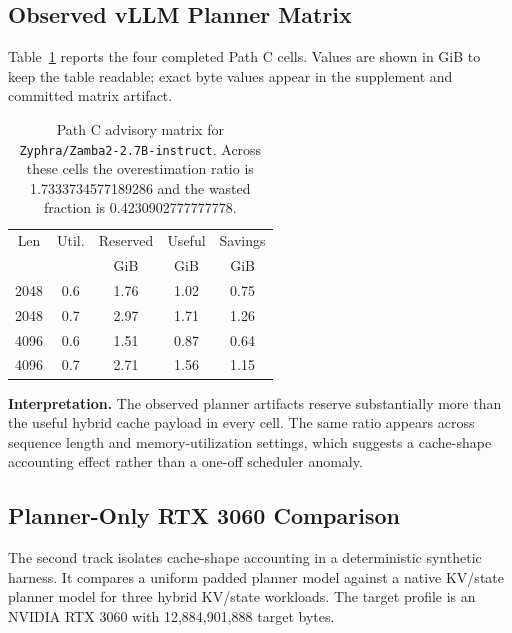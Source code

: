 \documentclass[10pt,twocolumn]{article}
\newcommand{\pathc}{Path C}
\newcommand{\plannerpad}{uniform padded}
\newcommand{\plannernative}{native KV/state}
\begin{document}
\subsection{Observed vLLM Planner Matrix}

Table~\ref{tab:pathc} reports the four completed \pathc{} cells. Values are
shown in GiB to keep the table readable; exact byte values appear in the
supplement and committed matrix artifact.

\begin{table}[t]
\centering
\small
\begin{tabular}{ccccc}
\toprule
Len & Util. & Reserved & Useful & Savings \\
 & & GiB & GiB & GiB \\
\midrule
2048 & 0.6 & 1.76 & 1.02 & 0.75 \\
2048 & 0.7 & 2.97 & 1.71 & 1.26 \\
4096 & 0.6 & 1.51 & 0.87 & 0.64 \\
4096 & 0.7 & 2.71 & 1.56 & 1.15 \\
\bottomrule
\end{tabular}
\caption{\pathc{} advisory matrix for
\texttt{Zyphra/Zamba2-2.7B-instruct}. Across these cells the overestimation
ratio is 1.7333734577189286 and the wasted fraction is 0.4230902777777778.}
\label{tab:pathc}
\end{table}

\textbf{Interpretation.}
The observed planner artifacts reserve substantially more than the useful
hybrid cache payload in every cell. The same ratio appears across sequence
length and memory-utilization settings, which suggests a cache-shape accounting
effect rather than a one-off scheduler anomaly.

\subsection{Planner-Only RTX 3060 Comparison}

The second track isolates cache-shape accounting in a deterministic synthetic
harness. It compares a \plannerpad{} planner model against a \plannernative{}
planner model for three hybrid KV/state workloads. The target profile is an
NVIDIA RTX 3060 with 12,884,901,888 target bytes.
\end{document}

